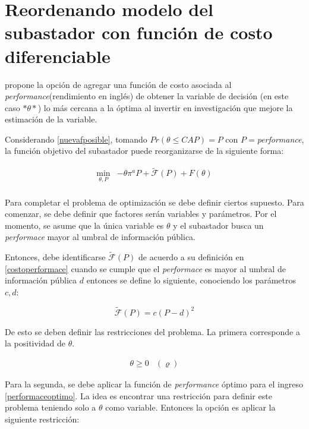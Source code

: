 \section{Reordenando modelo del subastador con función de costo diferenciable}

 propone la opción de agregar una función de costo asociada al \textit{performance}(rendimiento en inglés) de obtener la variable de decisión (en este caso $*\theta*$) lo más cercana a la óptima al invertir en investigación que mejore la estimación de la variable.
\vspace{2.5mm}

Considerando \ref{nuevafposible}, tomando $Pr(\theta\leq CAP) = P$ con $P = $\textit{performance}, la función objetivo del subastador puede reorganizarse de la siguiente forma:

\begin{equation}
\begin{array}{rrclcl}
    \displaystyle \min_{\theta,P} & -\theta \pi^aP + \tilde{\mathcal{F}}(P)+F(\theta)  \label{fo:performance0}\\
\end{array}
\end{equation}

Para completar el problema de optimización se debe definir ciertos supuesto. Para comenzar, se debe definir que factores serán variables y parámetros. Por el momento, se asume que la única variable es $\theta$ y el subastador busca un \textit{performace} mayor al umbral de información pública.  
\vspace{2.5mm}

Entonces, debe identificarse $\tilde{\mathcal{F}}(P)$ de acuerdo a su definición en \ref{costoperformace} cuando se cumple que el \textit{performace} es mayor al umbral de información pública $d$ entonces se define lo siguiente, conociendo los parámetros $c, d$:

$$\tilde{\mathcal{F}}(P)=c(P-d)^2$$ 

De esto se deben definir las restricciones del problema. La primera corresponde a la positividad de $\theta$. 

\begin{equation}
\begin{array}{cl}
    \theta \geq 0 & (\varrho)\label{res:newsub1}
\end{array}
\end{equation}

Para la segunda, se debe aplicar la función de \textit{performance} óptimo para el ingreso \ref{performaceoptimo}. La idea es encontrar una restricción para definir este problema teniendo solo a $\theta$ como variable. Entonces la opción es aplicar la siguiente restricción: 

